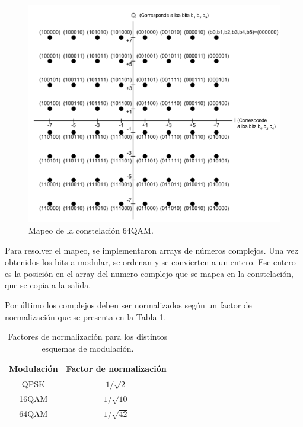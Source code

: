 \begin{figure}[!h]
\centering
\includegraphics[scale=0.5]{figuras/cap05/constelacion_64QAM}
\caption{\label{f:mapeo_64QAM} Mapeo de la constelaci\'on 64QAM.}
\end{figure}

Para resolver el mapeo, se implementaron arrays de números complejos. Una vez obtenidos los bits a modular, se ordenan y se convierten a un entero. Ese entero es la posición en el array del numero complejo que se mapea en la constelación, que se copia a la salida.

Por \'ultimo los complejos deben ser normalizados seg\'un un factor de normalizaci\'on que se presenta en la Tabla \ref{t:factor_normalizacion}.

\begin{table}[h!]
\centering
\begin{tabular}{|c|c|}
\hline
\textbf{Modulaci\'on} 				& \textbf{Factor de normalizaci\'on}\\
\hline
QPSK 		& $1/ \sqrt{2}$\\
\hline
16QAM		& $1/ \sqrt{10}$ \\
\hline
64QAM 		& $1/ \sqrt{42}$ \\
\hline
\end{tabular}
\caption{\label{t:factor_normalizacion} Factores de normalizaci\'on para los distintos esquemas de modulaci\'on.}
\end{table}



